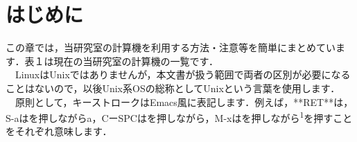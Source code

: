 \documentclass[main]{subfiles}
\begin{document}
\chapter{はじめに}
\fontsize{10}{10} \selectfont
この章では，当研究室の計算機を利用する方法・注意等を簡単にまとめています．表１は現在の当研究室の計算機の一覧です．\\
　LinuxはUnixではありませんが，本文書が扱う範囲で両者の区別が必要になることはないので，以後Unix系OSの総称としてUnixという言葉を使用します．\\
　原則として，キーストロークはEmacs風に表記します．例えば，**RET**は，S-aはを押しながらa，CーSPCはを押しながら，M-xはを押しながら\textsuperscript{1}を押すことをそれぞれ意味します．
\end{document}
